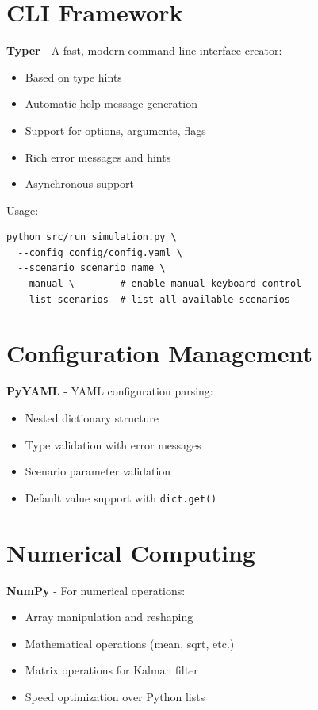 \section{CLI Framework}

\textbf{Typer} - A fast, modern command-line interface creator:
\begin{itemize}
    \item Based on type hints
    \item Automatic help message generation
    \item Support for options, arguments, flags
    \item Rich error messages and hints
    \item Asynchronous support
\end{itemize}

Usage:
\begin{verbatim}
python src/run_simulation.py \
  --config config/config.yaml \
  --scenario scenario_name \
  --manual \        # enable manual keyboard control
  --list-scenarios  # list all available scenarios
\end{verbatim}

\section{Configuration Management}

\textbf{PyYAML} - YAML configuration parsing:
\begin{itemize}
    \item Nested dictionary structure
    \item Type validation with error messages
    \item Scenario parameter validation
    \item Default value support with \texttt{dict.get()}
\end{itemize}

\section{Numerical Computing}

\textbf{NumPy} - For numerical operations:
\begin{itemize}
    \item Array manipulation and reshaping
    \item Mathematical operations (mean, sqrt, etc.)
    \item Matrix operations for Kalman filter
    \item Speed optimization over Python lists
\end{itemize}

